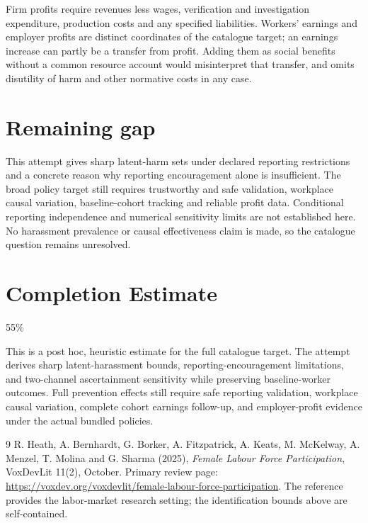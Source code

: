 \documentclass[11pt,a4paper]{article}
\begin{document}
Firm profits require revenues less wages, verification and investigation expenditure, production costs and any specified liabilities. Workers' earnings and employer profits are distinct coordinates of the catalogue target; an earnings increase can partly be a transfer from profit. Adding them as social benefits without a common resource account would misinterpret that transfer, and omits disutility of harm and other normative costs in any case.

\section{Remaining gap}
This attempt gives sharp latent-harm sets under declared reporting restrictions and a concrete reason why reporting encouragement alone is insufficient. The broad policy target still requires trustworthy and safe validation, workplace causal variation, baseline-cohort tracking and reliable profit data. Conditional reporting independence and numerical sensitivity limits are not established here. No harassment prevalence or causal effectiveness claim is made, so the catalogue question remains unresolved.

\section{Completion Estimate}
55\%

This is a post hoc, heuristic estimate for the full catalogue target.
The attempt derives sharp latent-harassment bounds, reporting-encouragement limitations, and two-channel ascertainment sensitivity while preserving baseline-worker outcomes. Full prevention effects still require safe reporting validation, workplace causal variation, complete cohort earnings follow-up, and employer-profit evidence under the actual bundled policies.

\begin{thebibliography}{9}
 R. Heath, A. Bernhardt, G. Borker, A. Fitzpatrick, A. Keats, M. McKelway, A. Menzel, T. Molina and G. Sharma (2025), \emph{Female Labour Force Participation}, VoxDevLit 11(2), October. Primary review page: \url{https://voxdev.org/voxdevlit/female-labour-force-participation}. The reference provides the labor-market research setting; the identification bounds above are self-contained.
\end{thebibliography}
\end{document}
